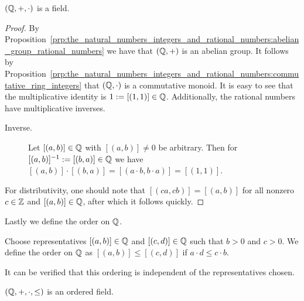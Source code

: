 \documentclass[../main.tex]{subfiles}
\begin{document}
\begin{proposition}\label{prp:the_natural_numbers_integers_and_rational_numbers:field_rational_numbers}
    $(\mathbb{Q},+,\cdot)$ is a field.
\end{proposition}
\begin{proof}
    By Proposition~\ref{prp:the_natural_numbers_integers_and_rational_numbers:abelian_group_rational_numbers} we have that $(\mathbb{Q},+)$ is an abelian group. It follows by Proposition~\ref{prp:the_natural_numbers_integers_and_rational_numbers:commutative_ring_integers} that $(\mathbb{Q},\cdot)$ is a commutative monoid. It is easy to see that the multiplicative identity is $1:=[(1,1)]\in\mathbb{Q}$. Additionally, the rational numbers have multiplicative inverses.
    \begin{description}
        \item[Inverse.] Let $[(a,b)]\in\mathbb{Q}$ with $[(a,b)]\neq0$ be arbitrary. Then for $[(a,b)]^{-1}:=[(b,a)]\in\mathbb{Q}$ we have $[(a,b)]\cdot[(b,a)]=[(a\cdot b,b\cdot a)]=[(1,1)]$.
    \end{description}
    For distributivity, one should note that $[(ca,cb)]=[(a,b)]$ for all nonzero $c\in\mathbb{Z}$ and $[(a,b)]\in\mathbb{Q}$, after which it follows quickly.
\end{proof}
Lastly we define the order on $\mathbb{Q}$.
\begin{definition}
    Choose representatives $[(a,b)]\in\mathbb{Q}$ and $[(c,d)]\in\mathbb{Q}$ such that $b>0$ and $c>0$. We define the order on $\mathbb{Q}$ as $[(a,b)]\leq[(c,d)]$ if $a\cdot d\leq c\cdot b$.
\end{definition}
It can be verified that this ordering is independent of the representatives chosen.
\begin{proposition}\label{prp:the_natural_numbers_integers_and_rational_numbers:ordered_field_rational_numbers}
    $(\mathbb{Q},+,\cdot,\leq)$ is an ordered field.
\end{proposition}
\end{document}
